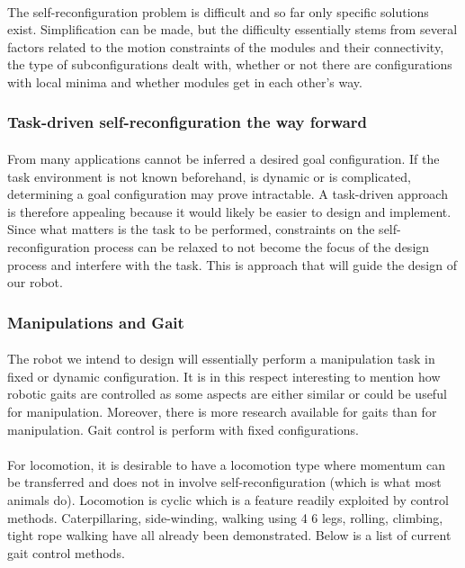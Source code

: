 \paragraph{}The self-reconfiguration problem is difficult	 and so far only specific solutions exist. Simplification can be made, but the difficulty essentially stems from several factors related to the motion constraints of the modules and their connectivity, the type of  subconfigurations dealt with, whether or not there are configurations with local minima and whether modules get in each other's way.
\subsubsection{Task-driven self-reconfiguration the way forward}
\paragraph{}From many applications cannot be inferred a desired goal configuration. If the task environment is not known beforehand, is dynamic or is complicated, determining a goal configuration may prove intractable. A task-driven approach is therefore appealing because it would likely be easier to design and implement. Since what matters is the task to be performed, constraints on  the self-reconfiguration process can be relaxed to not become the focus of the design process and interfere with the task. This is approach that will guide the design of our robot.
\subsubsection{Manipulations and Gait}
\paragraph{}The robot we intend to design will essentially perform a manipulation task in fixed or dynamic configuration. It is in this respect interesting to mention how robotic gaits are controlled as some aspects are either similar or could be useful for manipulation. Moreover, there is more research available for gaits than for manipulation. Gait control is perform with fixed configurations.
\paragraph{}For locomotion, it is desirable to have a locomotion type where momentum can be transferred and does not in involve self-reconfiguration (which is what most animals do). Locomotion is cyclic which is a feature readily exploited by control methods. Caterpillaring, side-winding, walking using 4 6 legs, rolling, climbing, tight rope walking have all already been demonstrated. Below is a list of current gait control methods.
